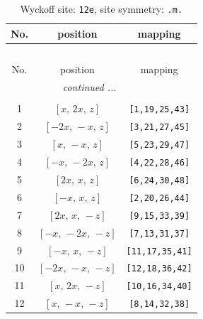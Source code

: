 \documentclass[fleqn,8pt]{jsarticle}
\begin{document}
\begin{longtable}{ccc}
\caption{Wyckoff site: {\tt 12e}, site symmetry: {\tt .m.}}
 \\
 \hline \hline
No. & position & mapping \\ \hline \endfirsthead

\multicolumn{2}{l}{\tablename\ \thetable{}} \\
 \hline \hline
No. & position & mapping \\ \hline \endhead

 \hline \hline
\multicolumn{2}{r}{\footnotesize\it continued ...} \\ \endfoot

 \hline \hline
\multicolumn{2}{r}{} \\ \endlastfoot

1 & $\left[ x,\, 2 x,\, z \right]$ & {\tt [1,19,25,43]} \\ \hline
2 & $\left[ - 2 x,\, - x,\, z \right]$ & {\tt [3,21,27,45]} \\ \hline
3 & $\left[ x,\, - x,\, z \right]$ & {\tt [5,23,29,47]} \\ \hline
4 & $\left[ - x,\, - 2 x,\, z \right]$ & {\tt [4,22,28,46]} \\ \hline
5 & $\left[ 2 x,\, x,\, z \right]$ & {\tt [6,24,30,48]} \\ \hline
6 & $\left[ - x,\, x,\, z \right]$ & {\tt [2,20,26,44]} \\ \hline
7 & $\left[ 2 x,\, x,\, - z \right]$ & {\tt [9,15,33,39]} \\ \hline
8 & $\left[ - x,\, - 2 x,\, - z \right]$ & {\tt [7,13,31,37]} \\ \hline
9 & $\left[ - x,\, x,\, - z \right]$ & {\tt [11,17,35,41]} \\ \hline
10 & $\left[ - 2 x,\, - x,\, - z \right]$ & {\tt [12,18,36,42]} \\ \hline
11 & $\left[ x,\, 2 x,\, - z \right]$ & {\tt [10,16,34,40]} \\ \hline
12 & $\left[ x,\, - x,\, - z \right]$ & {\tt [8,14,32,38]} \\
\end{longtable}
\renewcommand{\arraystretch}{1.2}
\end{document}
